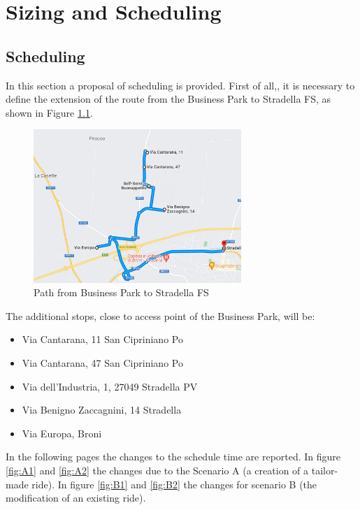 \chapter{Sizing and Scheduling}
\label{ch:sizeschedule}

\section{Scheduling}
In this section a proposal of scheduling is provided. First of all,, it is necessary to define the extension of the route from the Business Park to Stradella FS, as shown in Figure \ref{fig:path}.

\begin{figure}[h]
    \centering
    \includegraphics[width=0.7\textwidth]{Images/Scheduling/Path.png}
    \caption{Path from Business Park to Stradella FS}
    \label{fig:path}
\end{figure}




The additional stops, close to access point of the Business Park, will be:
\begin{itemize}
    \item Via Cantarana, 11 San Cipriniano Po
    \item Via Cantarana, 47 San Cipriniano Po
    \item Via dell'Industria, 1, 27049 Stradella PV
    \item Via Benigno Zaccagnini, 14 Stradella
    \item Via Europa, Broni
\end{itemize}


In the following pages the changes to the schedule time are reported. In figure \ref{fig:A1} and \ref{fig:A2} the changes due to the Scenario A (a creation of a tailor-made ride). In figure \ref{fig:B1} and \ref{fig:B2} the changes for scenario B (the modification of an existing ride).

